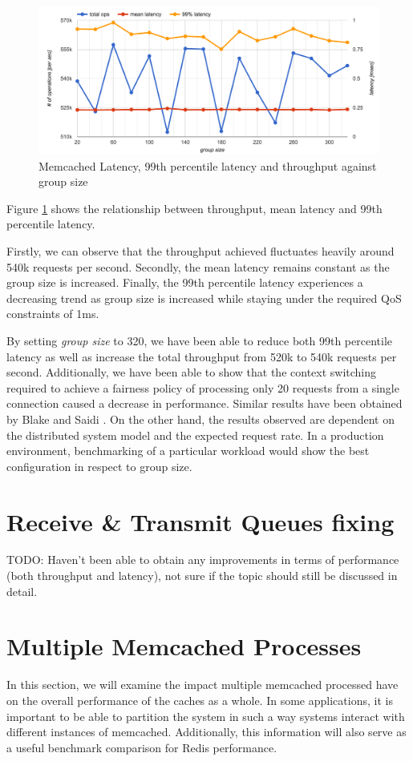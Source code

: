 \begin{figure}[h]
    \includegraphics[width=\textwidth]{./res/5_memcached_group_size.png}
    \caption{Memcached Latency, 99th percentile latency and throughput against group size}
    \label{fig:memcached_group_size}
\end{figure}

Figure \ref{fig:memcached_group_size} shows the relationship between throughput, mean latency and 99th percentile latency.

Firstly, we can observe that the throughput achieved fluctuates heavily around 540k requests per second. Secondly, the mean latency remains constant as the group size is increased. Finally, the 99th percentile latency experiences a decreasing trend as group size is increased while staying under the required QoS constraints of 1ms.

By setting \textit{group size} to 320, we have been able to reduce both 99th percentile latency as well as increase the total throughput from 520k to 540k requests per second. Additionally, we have been able to show that the context switching required to achieve a fairness policy of processing only 20 requests from a single connection caused a decrease in performance. Similar results have been obtained by Blake and Saidi \cite{blake54does}. On the other hand, the results observed are dependent on the distributed system model and the expected request rate. In a production environment, benchmarking of a particular workload would show the best configuration in respect to group size.

\section{Receive \& Transmit Queues fixing}
TODO: Haven't been able to obtain any improvements in terms of performance (both throughput and latency), not sure if the topic should still be discussed in detail.


\section{Multiple Memcached Processes}

In this section, we will examine the impact multiple memcached processed have on the overall performance of the caches as a whole. In some applications, it is important to be able to partition the system in such a way systems interact with different instances of memcached. Additionally, this information will also serve as a useful benchmark comparison for Redis performance.